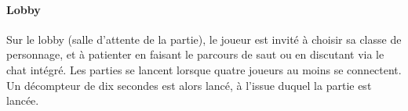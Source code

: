 \paragraph{Lobby}

    Sur le lobby (salle d'attente de la partie), le joueur est invité à choisir sa classe de personnage, et à 
    patienter en faisant le parcours de saut ou en discutant via le chat intégré. Les parties se lancent lorsque quatre joueurs au moins 
    se connectent. Un décompteur de dix secondes est alors lancé, à l'issue duquel la partie est lancée.

    